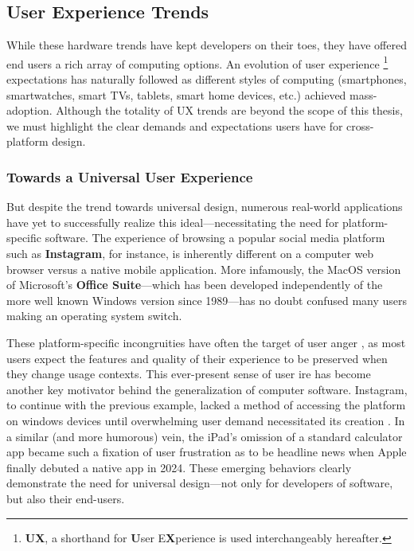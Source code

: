 \documentclass{report}
\newcommand{\tech}[1]{\textbf{#1}}
\begin{document}
\subsection{User Experience Trends}
While these hardware trends have kept developers on their toes, they have offered end users a rich array of computing options. An evolution of user experience \footnote{\textbf{UX}, a shorthand for \textbf{U}ser E\textbf{X}perience is used interchangeably hereafter.} expectations has naturally followed as different styles of computing (smartphones, smartwatches, smart TVs, tablets, smart home devices, etc.) achieved mass-adoption. Although the totality of UX trends are beyond the scope of this thesis, we must highlight the clear demands and expectations users have for cross-platform design. 

\subsubsection{Towards a Universal User Experience}
But despite the trend towards universal design, numerous real-world applications have yet to successfully realize this ideal---necessitating the need for platform-specific software. The experience of browsing a popular social media platform such as \tech{Instagram}, for instance, is inherently different on a computer web browser versus a native mobile application. More infamously, the MacOS version of Microsoft's \tech{Office Suite}---which has been developed independently of the more well known Windows version since 1989---has no doubt confused many users making an operating system switch.

These platform-specific incongruities have often the target of user anger \cite{Paquin_2010}, as most users expect the features and quality of their experience to be preserved when they change usage contexts. This ever-present sense of user ire has become another key motivator behind the generalization of computer software. Instagram, to continue with the previous example, lacked a method of accessing the platform on windows devices until overwhelming user demand necessitated its creation \cite{Warren2013}. In a similar (and more humorous) vein, the iPad's omission of a standard calculator app became such a fixation of user frustration as to be headline news \cite{Weinstein_2024} when Apple finally debuted a native app in 2024. These emerging behaviors clearly demonstrate the need for universal design---not only for developers of software, but also their end-users. 
\end{document}
